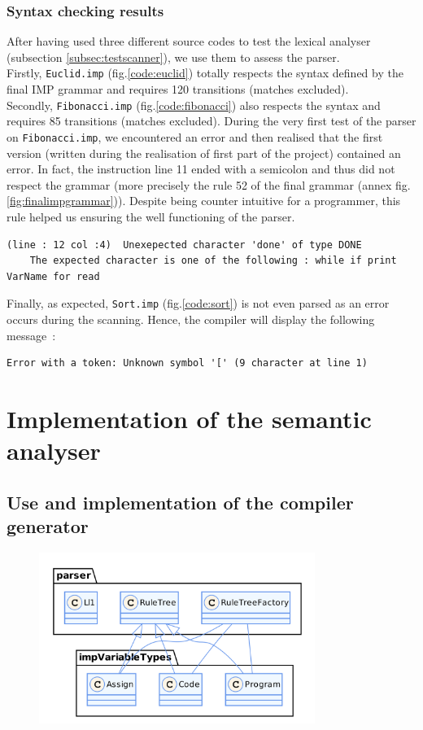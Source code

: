\documentclass[a4paper,11pt]{article}
\begin{document}
    \subsubsection{Syntax checking results}  
      After having used three different source codes to test the lexical analyser (subsection \ref{subsec:testscanner}), we use them to assess the parser.\\
      Firstly, \verb|Euclid.imp| (fig.\ref{code:euclid}) totally respects the syntax defined by the final IMP grammar and requires 120 transitions (matches excluded).\\ %
      Secondly, \verb|Fibonacci.imp| (fig.\ref{code:fibonacci}) also respects the syntax and requires 85 transitions (matches excluded). During the very first test of the parser on \verb|Fibonacci.imp|, we encountered an error and then realised that the first version (written during the realisation of first part of the project) contained an error. In fact, the instruction line 11 ended with a semicolon and thus did not respect the grammar (more precisely the rule 52 of the final grammar (annex fig.\ref{fig:finalimpgrammar})). Despite being counter intuitive for a programmer, this rule helped us ensuring the well functioning of the parser.
        \begin{verbatim}
(line : 12 col :4)	Unexepected character 'done' of type DONE
    The expected character is one of the following : while if print VarName for read
        \end{verbatim}
    Finally, as expected, \verb|Sort.imp| (fig.\ref{code:sort}) is not even parsed as an error occurs during the scanning. Hence, the compiler will display the following message~:
      \begin{verbatim}
Error with a token: Unknown symbol '[' (9 character at line 1)
      \end{verbatim}
      
\section{Implementation of the semantic analyser}

  \subsection{Use and implementation of the compiler generator}
    \begin{figure}[h!]
      \centering
      \includegraphics[width=0.8\textwidth]{img/class_ruleTree.png}
    \end{figure}
\end{document}
